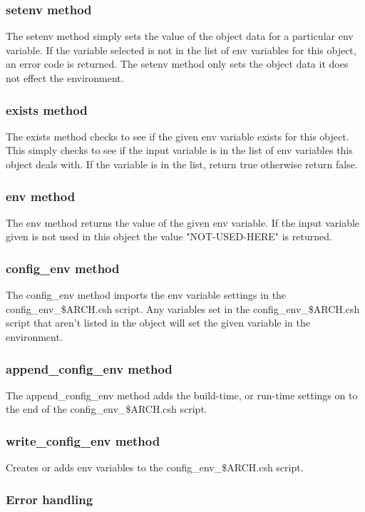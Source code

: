 \documentclass[]{article}
\begin{document}
\subsubsection{setenv method}
The setenv method simply sets the value of the object data for a particular env variable. If
the variable selected is not in the list of env variables for this object, an error code is
returned. The setenv method only sets the object data it does not effect the environment.
\subsubsection{exists method}
The exists method checks to see if the given env variable exists for this object. This simply
checks to see if the input variable is in the list of env variables this object deals with. If
the variable is in the list, return true otherwise return false.
\subsubsection{env method}
The env method returns the value of the given env variable. If the input variable given is not
used in this object the value "NOT-USED-HERE" is returned.
\subsubsection{config\_env method}
The config\_env method imports the env variable settings in the config\_env\_\$ARCH.csh 
script. Any variables set in the config\_env\_\$ARCH.csh script that aren't listed in
the object will set the given variable in the environment.
\subsubsection{append\_config\_env method}
The append\_config\_env method adds the build-time, or run-time settings on to the end 
of the config\_env\_\$ARCH.csh script.
\subsubsection{write\_config\_env method}
Creates or adds env variables to the config\_env\_\$ARCH.csh script.

\subsubsection{Error handling}
\end{document}
